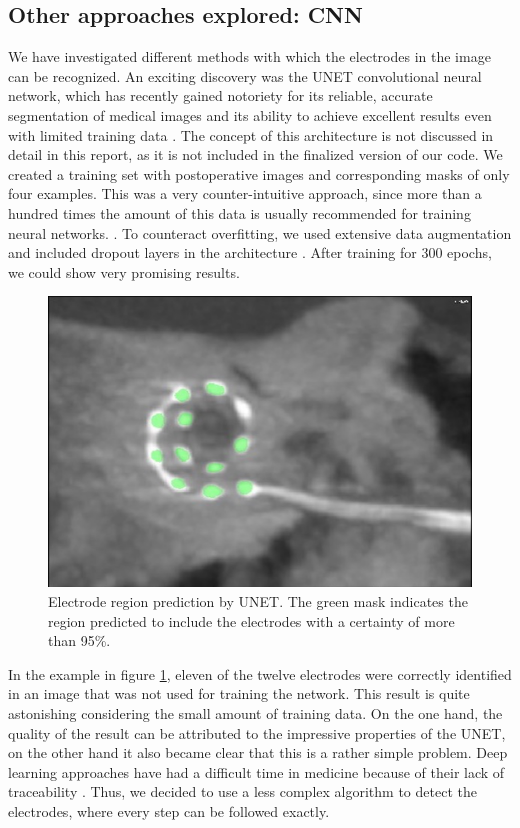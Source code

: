 \documentclass[a4paper, 10pt, twocolumn]{article}
\begin{document}
\subsection{Other approaches explored: CNN}
We have investigated different methods with which the electrodes in the image can be recognized. An exciting discovery was the UNET convolutional neural network, which has recently gained notoriety for its reliable, accurate segmentation of medical images and its ability to achieve excellent results even with limited training data \cite{ronneberger_u-net_2015}. The concept of this architecture is not discussed in detail in this report, as it is not included in the finalized version of our code. We created a training set with postoperative images and corresponding masks of only four examples. This was a very counter-intuitive approach, since more than a hundred times the amount of this data is usually recommended for training neural networks. \cite{hestness_deep_2017,foody_effect_1995}. To counteract overfitting, we used extensive data augmentation and included dropout layers in the architecture \cite{wu_towards_2015}. After training for 300 epochs, we could show very promising results.
\begin{figure}[]
	\centering
  \includegraphics[width=.5\textwidth]{UNET.jpg}
	\caption{Electrode region prediction by UNET. The green mask indicates the region predicted to include the electrodes with a certainty of more than 95\%.}
	\label{UNET}
\end{figure}
In the example in figure \ref{UNET}, eleven of the twelve electrodes were correctly identified in an image that was not used for training the network. This result is quite astonishing considering the small amount of training data. On the one hand, the quality of the result can be attributed to the impressive properties of the UNET, on the other hand it also became clear that this is a rather simple problem. Deep learning approaches have had a difficult time in medicine because of their lack of traceability \cite{litjens_survey_2017}. Thus, we decided to use a less complex algorithm to detect the electrodes, where every step can be followed exactly.
\end{document}
